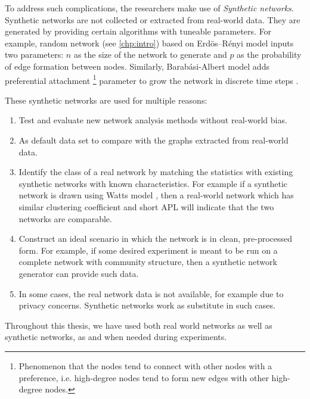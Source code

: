 	To address such complications, the researchers make use of \textit{Synthetic networks}. Synthetic networks are not collected or extracted from real-world data. They are generated by providing certain algorithms with tuneable parameters. For example, random network (see \ref{chp:intro}) based on Erdös–Rényi model \cite{erdos1960} inputs two parameters: $n$ as the size of the network to generate and $p$ as the probability of edge formation between nodes. Similarly, Barabási-Albert model adds preferential attachment \footnote{Phenomenon that the nodes tend to connect with other nodes with a preference, i.e. high-degree nodes tend to form new edges with other high-degree nodes.} parameter to grow the network in discrete time steps \cite{barabasi1999}.
	
	These synthetic networks are used for multiple reasons:
	
	\begin{enumerate}
		\item Test and evaluate new network analysis methods without real-world bias.
		
		\item As default data set to compare with the graphs extracted from real-world data.  		
		\item Identify the class of a real network by matching the statistics with existing synthetic networks with known characteristics. For example if a synthetic network is drawn using Watts model \cite{watts1998}, then a real-world network which has similar clustering coefficient and short APL will indicate that the two networks are comparable.
		
		\item Construct an ideal scenario in which the network is in clean, pre-processed form. For example, if some desired experiment is meant to be run on a complete network with community structure, then a synthetic network generator can provide such data.
		
		\item In some cases, the real network data is not available, for example due to privacy concerns. Synthetic networks work as substitute in such cases.
	\end{enumerate}

Throughout this thesis, we have used both real world networks as well as synthetic networks, as and when needed during experiments.
	

